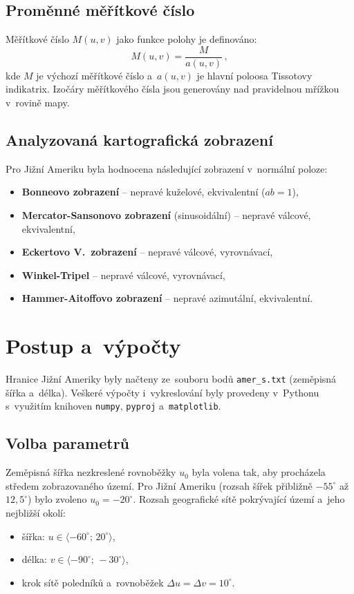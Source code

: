 \documentclass[11pt, a4paper]{article}
\begin{document}
\subsection{Proměnné měřítkové číslo}

Měřítkové číslo $M(u,v)$ jako funkce polohy je definováno:
\begin{equation}
    M(u,v) = \frac{M}{a(u,v)}\,,
\end{equation}
kde $M$ je výchozí měřítkové číslo a~$a(u,v)$ je hlavní poloosa Tissotovy indikatrix. Izočáry měřítkového čísla jsou generovány nad pravidelnou mřížkou v~rovině mapy.

\subsection{Analyzovaná kartografická zobrazení}

Pro Jižní Ameriku byla hodnocena následující zobrazení v~normální poloze:
\begin{itemize}
    \item \textbf{Bonneovo zobrazení} -- nepravé kuželové, ekvivalentní ($ab = 1$),
    \item \textbf{Mercator-Sansonovo zobrazení} (sinusoidální) -- nepravé válcové, ekvivalentní,
    \item \textbf{Eckertovo V.~zobrazení} -- nepravé válcové, vyrovnávací,
    \item \textbf{Winkel-Tripel} -- nepravé válcové, vyrovnávací,
    \item \textbf{Hammer-Aitoffovo zobrazení} -- nepravé azimutální, ekvivalentní.
\end{itemize}

\newpage

\section{Postup a~výpočty}

Hranice Jižní Ameriky byly načteny ze~souboru bodů \texttt{amer\_s.txt} (zeměpisná šířka a~délka). Veškeré výpočty i~vykreslování byly provedeny v~Pythonu s~využitím knihoven \texttt{numpy}, \texttt{pyproj} a~\texttt{matplotlib}.

\subsection{Volba parametrů}

Zeměpisná šířka nezkreslené rovnoběžky $u_0$ byla volena tak, aby procházela středem zobrazovaného území. Pro Jižní Ameriku (rozsah šířek přibližně $-55^{\circ}$ až $12{,}5^{\circ}$) bylo zvoleno $u_0 = -20^{\circ}$. Rozsah geografické sítě pokrývající území a~jeho nejbližší okolí:
\begin{itemize}
    \item šířka: $u \in \langle -60^{\circ};\, 20^{\circ} \rangle$,
    \item délka: $v \in \langle -90^{\circ};\, -30^{\circ} \rangle$,
    \item krok sítě poledníků a~rovnoběžek $\Delta u = \Delta v = 10^{\circ}$.
\end{itemize}
\end{document}
